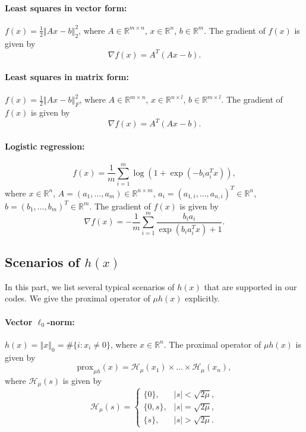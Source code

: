 \documentclass[a4paper]{article}
\newcommand{\norm}[1]{\left\Vert#1\right\Vert}
\newcommand{\mr}{\mathbb{R}}
\newcommand{\mh}{\mathcal{H}}
\newcommand{\prox}{\mathrm{prox}}
\begin{document}
\paragraph{Least squares in vector form:} $f(x) = \frac{1}{2} 
\norm{Ax - b}_2^2$, where $A \in \mr^{m \times n}$, $x \in \mr^n$, $b 
\in \mr^m$. The gradient of $f(x)$ is given by %
\begin{displaymath}
  \nabla f(x) = A^T (A x - b).
\end{displaymath}

\paragraph{Least squares in matrix form:} $f(x) = \frac{1}{2} 
\norm{Ax - b}_F^2$, where $A \in \mr^{m \times n}$, $x \in \mr^{n 
\times l}$, $b \in \mr^{m \times l}$. The gradient of $f(x)$ is given 
by
\begin{displaymath}
  \nabla f(x) = A^T  (A x - b).
\end{displaymath}

\paragraph{Logistic regression:} 
\begin{displaymath}
  f(x) = \frac{1}{m} \sum_{i = 1}^{m} \log(1 + \exp(- b_i a_i^T x)),
\end{displaymath}
where $x \in \mr^n$, $A = (a_1, \ldots, a_m) \in \mr^{n \times m}$, 
$a_i = (a_{1,i}, \ldots, a_{n,i})^T \in \mr^n$,
$b = (b_1, \ldots, b_m)^T \in \mr^m$. The gradient of $f(x)$ is given 
by
\begin{displaymath}
  \nabla f(x) = - \frac{1}{m} \sum_{i = 1}^{m} \frac{b_i 
  a_i}{\exp(b_i a_i^T x) + 1}.
\end{displaymath}


\subsection{Scenarios of $h(x)$}
\label{sec:cal_h}
In this part, we list several typical scenarios of $h(x)$ that are 
supported in our codes. We give the proximal operator of $\mu h(x)$ 
explicitly.

\paragraph{Vector $\ell_0$-norm: } $h(x) = \norm{x}_0 = \# \{i:x_i 
\ne 0\}$, where $x \in \mr^n$. The proximal operator of $\mu h(x)$ is 
given by
\begin{displaymath}
  \prox_{\mu h}(x) = \mh_{\mu}(x_1) \times \ldots \times 
  \mh_{\mu}(x_n),
\end{displaymath}
where $\mh_{\mu}(s)$ is given by
\begin{displaymath}
  \mh_{\mu}(s) = 
  \begin{cases}
    \{0\},    & |s| < \sqrt{2\mu}, \\
    \{0, s\}, & |s| = \sqrt{2\mu}, \\
    \{s\},    & |s| > \sqrt{2\mu}.
  \end{cases}
\end{displaymath}
\end{document}
